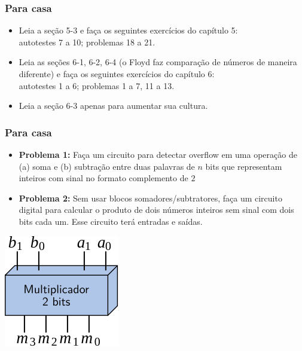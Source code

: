 \documentclass{beamer}
\begin{document}

\begin{frame}
\frametitle{Para casa}

\begin{itemize}
\item Leia a seção 5-3 e faça os seguintes exercícios do capítulo 5:\\
autotestes 7 a 10; problemas 18 a 21.
\item Leia as seções 6-1, 6-2, 6-4 (o Floyd faz comparação de números
de maneira diferente) e faça os seguintes exercícios do capítulo 6:\\
autotestes 1 a 6; problemas 1 a 7, 11 a 13.
\item Leia a seção 6-3 apenas para aumentar sua cultura.
\end{itemize}
\end{frame}


\begin{frame}
\frametitle{Para casa}

\begin{itemize}
\item \textbf{Problema 1:} Faça um circuito para detectar overflow
em uma operação de (a) soma e (b) subtração entre duas palavras de
$n$ bits que representam inteiros com sinal no formato complemento
de $2$\\[12pt]
\pause
\item \textbf{Problema 2:} Sem usar blocos somadores/subtratores,
faça um circuito digital
para calcular o produto de dois números inteiros sem sinal com dois
bits cada um. Esse circuito terá \only<2>{\phantom{4}}\only<3->{4} entradas
e  saídas.
\end{itemize}

\pause
\begin{center}
\includegraphics{images/multiplier}
\end{center}
\end{frame}
\end{document}

